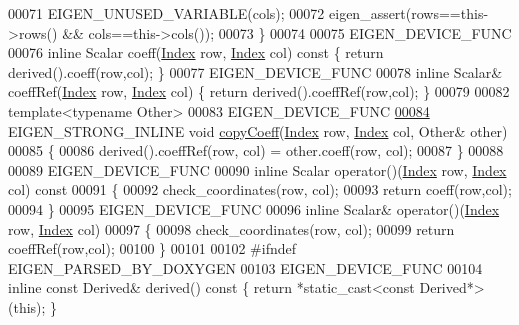 \begin{DoxyCode}
00071       EIGEN\_UNUSED\_VARIABLE(cols);
00072       eigen\_assert(rows==this->rows() && cols==this->cols());
00073     \}
00074 
00075     EIGEN\_DEVICE\_FUNC
00076     \textcolor{keyword}{inline} Scalar coeff(\hyperlink{namespace_eigen_a62e77e0933482dafde8fe197d9a2cfde}{Index} row, \hyperlink{namespace_eigen_a62e77e0933482dafde8fe197d9a2cfde}{Index} col)\textcolor{keyword}{ const  }\{ \textcolor{keywordflow}{return} derived().coeff(row,col); \}
00077     EIGEN\_DEVICE\_FUNC
00078     \textcolor{keyword}{inline} Scalar& coeffRef(\hyperlink{namespace_eigen_a62e77e0933482dafde8fe197d9a2cfde}{Index} row, \hyperlink{namespace_eigen_a62e77e0933482dafde8fe197d9a2cfde}{Index} col) \{ \textcolor{keywordflow}{return} derived().coeffRef(row,col); \}
00079 
00082     \textcolor{keyword}{template}<\textcolor{keyword}{typename} Other>
00083     EIGEN\_DEVICE\_FUNC
\hyperlink{group___core___module_ae93491f8454e133ff48202bf7c0c59e7}{00084}     EIGEN\_STRONG\_INLINE \textcolor{keywordtype}{void} \hyperlink{group___core___module_ae93491f8454e133ff48202bf7c0c59e7}{copyCoeff}(\hyperlink{group___core___module_a554f30542cc2316add4b1ea0a492ff02}{Index} row, \hyperlink{group___core___module_a554f30542cc2316add4b1ea0a492ff02}{Index} col, Other& other)
00085     \{
00086       derived().coeffRef(row, col) = other.coeff(row, col);
00087     \}
00088 
00089     EIGEN\_DEVICE\_FUNC
00090     \textcolor{keyword}{inline} Scalar operator()(\hyperlink{group___core___module_a554f30542cc2316add4b1ea0a492ff02}{Index} row, \hyperlink{group___core___module_a554f30542cc2316add4b1ea0a492ff02}{Index} col)\textcolor{keyword}{ const}
00091 \textcolor{keyword}{    }\{
00092       check\_coordinates(row, col);
00093       \textcolor{keywordflow}{return} coeff(row,col);
00094     \}
00095     EIGEN\_DEVICE\_FUNC
00096     \textcolor{keyword}{inline} Scalar& operator()(\hyperlink{group___core___module_a554f30542cc2316add4b1ea0a492ff02}{Index} row, \hyperlink{group___core___module_a554f30542cc2316add4b1ea0a492ff02}{Index} col)
00097     \{
00098       check\_coordinates(row, col);
00099       \textcolor{keywordflow}{return} coeffRef(row,col);
00100     \}
00101 
00102 \textcolor{preprocessor}{    #ifndef EIGEN\_PARSED\_BY\_DOXYGEN}
00103     EIGEN\_DEVICE\_FUNC
00104     \textcolor{keyword}{inline} \textcolor{keyword}{const} Derived& derived()\textcolor{keyword}{ const }\{ \textcolor{keywordflow}{return} *\textcolor{keyword}{static\_cast<}\textcolor{keyword}{const }Derived*\textcolor{keyword}{>}(\textcolor{keyword}{this}); \}

\end{DoxyCode}
